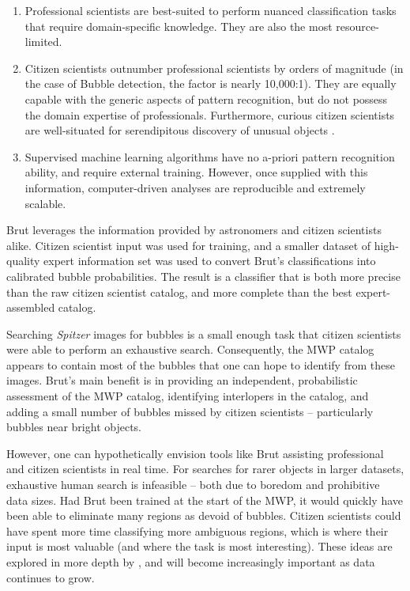 \documentclass[preprint]{aastex}
\begin{document}
\begin{enumerate}
\item Professional scientists are best-suited to perform nuanced classification tasks that require domain-specific knowledge. They are also the most resource-limited. 
\item Citizen scientists outnumber professional scientists by orders of magnitude (in the case of Bubble detection, the factor is nearly 10,000:1). They are equally capable with the generic aspects of pattern recognition, but do not possess the domain expertise of professionals. Furthermore, curious citizen scientists are well-situated for serendipitous discovery of unusual objects \citep{Lintott09, Cardamone09}.
\item Supervised machine learning algorithms have no a-priori pattern recognition ability, and require external training. However, once supplied with this information, computer-driven analyses are reproducible and extremely scalable.
\end{enumerate}

Brut leverages the information provided by astronomers and citizen scientists alike. Citizen scientist input was used for training, and a smaller dataset of high-quality expert information set was used to convert Brut's classifications into calibrated bubble probabilities. The result is a classifier that is both more precise than the raw citizen scientist catalog, and more complete than the best expert-assembled catalog.

Searching \emph{Spitzer} images for bubbles is a small enough task that citizen scientists were able to perform an exhaustive search. Consequently, the MWP catalog appears to contain most of the bubbles that one can hope to identify from these images. Brut's main benefit is in providing an independent, probabilistic assessment of the MWP catalog, identifying interlopers in the catalog, and adding a small number of bubbles missed by citizen scientists -- particularly bubbles near bright objects.

However, one can hypothetically envision tools like Brut assisting professional and citizen scientists in real time. For searches for rarer objects in larger datasets, exhaustive human search is infeasible -- both due to boredom and prohibitive data sizes. Had Brut been trained at the start of the MWP, it would quickly have been able to eliminate many regions as devoid of bubbles. Citizen scientists could have spent more time classifying more ambiguous regions, which is where their input is most valuable (and where the task is most interesting). These ideas are explored in more depth by \cite{MSR}, and will become increasingly important as data continues to grow. 
\end{document}
